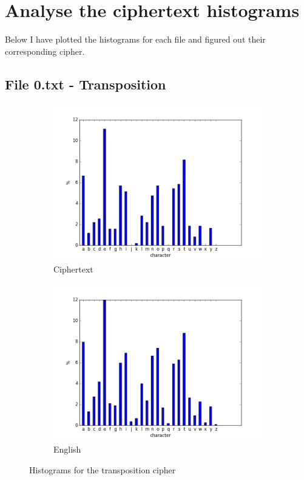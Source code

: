 \documentclass[a4paper]{article}
\date{}
\begin{document}
\thispagestyle{fancy}

\section{Analyse the ciphertext histograms}

    Below I have plotted the histograms for each file and figured out their corresponding cipher.

    \subsection{File 0.txt - Transposition}

        \begin{figure}[h]
            \centering
            \begin{subfigure}{.5\textwidth}
                \centering
                \includegraphics[width=1\textwidth]{histogram_0.png}
                \caption{Ciphertext}
            \end{subfigure}%
            \begin{subfigure}{.5\textwidth}
                \centering
                \includegraphics[width=1\textwidth]{histogram_english.png}
                \caption{English}
            \end{subfigure}
            \caption{Histograms for the transposition cipher}
        \end{figure}
\end{document}
